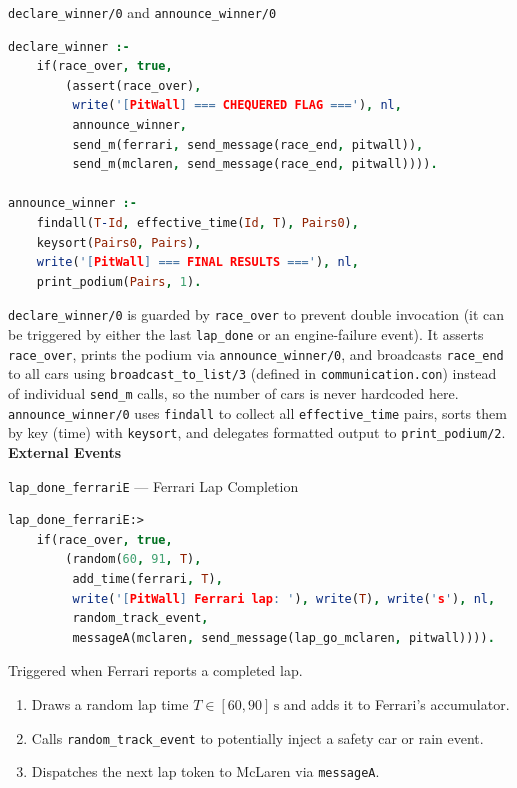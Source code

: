 \begin{minipage}{\linewidth}
\texttt{declare\_winner/0} and \texttt{announce\_winner/0}

\begin{lstlisting}[language=Prolog]
declare_winner :-
    if(race_over, true,
        (assert(race_over),
         write('[PitWall] === CHEQUERED FLAG ==='), nl,
         announce_winner,
         send_m(ferrari, send_message(race_end, pitwall)),
         send_m(mclaren, send_message(race_end, pitwall)))).

announce_winner :-
    findall(T-Id, effective_time(Id, T), Pairs0),
    keysort(Pairs0, Pairs),
    write('[PitWall] === FINAL RESULTS ==='), nl,
    print_podium(Pairs, 1).
\end{lstlisting}
\end{minipage}

\texttt{declare\_winner/0} is guarded by \texttt{race\_over} to prevent double
invocation (it can be triggered by either the last \texttt{lap\_done} or an
engine-failure event). It asserts \texttt{race\_over}, prints the podium via
\texttt{announce\_winner/0}, and broadcasts \texttt{race\_end} to all cars
using \texttt{broadcast\_to\_list/3} (defined in \texttt{communication.con})
instead of individual \texttt{send\_m} calls, so the number of cars is never
hardcoded here.
\texttt{announce\_winner/0} uses \texttt{findall} to collect all
\texttt{effective\_time} pairs, sorts them by key (time) with
\texttt{keysort}, and delegates formatted output to \texttt{print\_podium/2}.\\

\textbf{External Events}

\begin{minipage}{\linewidth}
\texttt{lap\_done\_ferrariE} --- Ferrari Lap Completion

\begin{lstlisting}[language=Prolog]
lap_done_ferrariE:>
    if(race_over, true,
        (random(60, 91, T),
         add_time(ferrari, T),
         write('[PitWall] Ferrari lap: '), write(T), write('s'), nl,
         random_track_event,
         messageA(mclaren, send_message(lap_go_mclaren, pitwall)))).
\end{lstlisting}
\end{minipage}

Triggered when Ferrari reports a completed lap.
\begin{enumerate}[leftmargin=2em, itemsep=2pt]
  \item Draws a random lap time $T \in [60, 90]\,\text{s}$ and adds it to Ferrari's accumulator.
  \item Calls \texttt{random\_track\_event} to potentially inject a safety car or rain event.
  \item Dispatches the next lap token to McLaren via \texttt{messageA}.\\
\end{enumerate}


